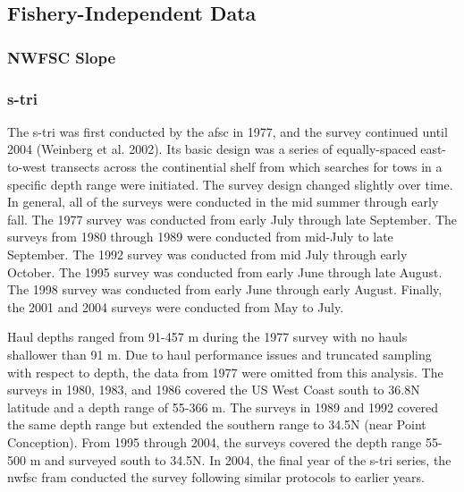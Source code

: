 \documentclass[11pt,
  english,
  a4paper,
]{article}
\begin{document}
\hypertarget{fishery-independent-data}{%
\subsection{Fishery-Independent Data}\label{fishery-independent-data}}

\leavevmode\tagmcend\tagstructend


\hypertarget{nwfsc-slope}{%
\subsubsection{NWFSC Slope}\label{nwfsc-slope}}

\leavevmode\tagmcend\tagstructend


\hypertarget{section}{%
\subsubsection{\texorpdfstring{\acrlong{s-tri}}{}}\label{section}}

\leavevmode\tagmcend\tagstructend


The \gls{s-tri} was first conducted by the \gls{afsc} in 1977, and the survey continued until 2004 {(Weinberg et al. 2002)\leavevmode\tagmcend\tagstructend}. Its basic design was a series of equally-spaced east-to-west transects across the continential shelf from which searches for tows in a specific depth range were initiated. The survey design changed slightly over time. In general, all of the surveys were conducted in the mid summer through early fall. The 1977 survey was conducted from early July through late September. The surveys from 1980 through 1989 were conducted from mid-July to late September. The 1992 survey was conducted from mid July through early October. The 1995 survey was conducted from early June through late August. The 1998 survey was conducted from early June through early August. Finally, the 2001 and 2004 surveys were conducted from May to July.

\leavevmode\tagmcend\tagstructend\par


Haul depths ranged from 91-457 m during the 1977 survey with no hauls shallower than 91 m. Due to haul performance issues and truncated sampling with respect to depth, the data from 1977 were omitted from this analysis. The surveys in 1980, 1983, and 1986 covered the US West Coast south to 36.8\textdegree N latitude and a depth range of 55-366 m. The surveys in 1989 and 1992 covered the same depth range but extended the southern range to 34.5\textdegree N (near Point Conception). From 1995 through 2004, the surveys covered the depth range 55-500 m and surveyed south to 34.5\textdegree N. In 2004, the final year of the \gls{s-tri} series, the \gls{nwfsc} \gls{fram} conducted the survey following similar protocols to earlier years.
\end{document}
